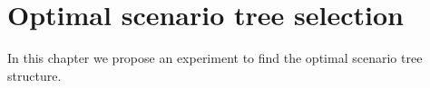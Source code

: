 \chapter{Optimal scenario tree selection}
In this chapter we propose an experiment to find the optimal scenario tree structure.